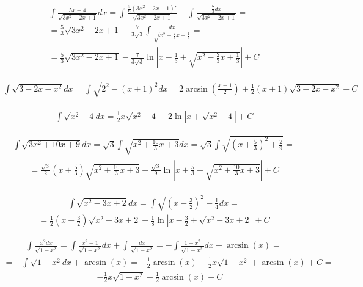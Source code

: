 \begin{gather*}
  \int \frac{5x-4}{\sqrt{3x^2-2x+1}}dx
  = \int \frac{\frac{5}{6}(3x^2-2x+1)'}{\sqrt{3x^2-2x+1}}-\int \frac{\frac{7}{3}dx}{\sqrt{3x^2-2x+1}} = \\
  = \frac{5}{3}\sqrt{3x^2-2x+1}-\frac{7}{3\sqrt{3}}\int \frac{dx}{\sqrt{x^2-\frac{2}{3}x+\frac{1}{3}}} = \\
  = \frac{5}{3}\sqrt{3x^2-2x+1}-\frac{7}{3\sqrt{3}}\ln\left|x-\frac{1}{3}+\sqrt{x^2-\frac{2}{3}x+\frac{1}{3}}\right|+C
\end{gather*}


\begin{gather*}\int \sqrt{3-2x-x^2}dx = \int \sqrt{2^2-(x+1)^2}dx = 2\arcsin \left(\frac{x+1}{2}\right) + \frac{1}{2}(x+1)\sqrt{3-2x-x^2}+C \end{gather*}



\begin{gather*}\int \sqrt{x^2-4}dx = \frac{1}{2}x\sqrt{x^2-4}-2\ln|x+\sqrt{x^2-4}|+C\end{gather*}


\begin{gather*}\int \sqrt{3x^2+10x+9}dx = \sqrt{3}\int \sqrt{x^2+\tfrac{10}{3}x+3}dx = \sqrt{3} \int \sqrt{(x+\tfrac{5}{3})^2+\tfrac{2}{9}} = \end{gather*}
\begin{gather*}= \frac{\sqrt{3}}{2}(x+\frac{5}{3})\sqrt{x^2+\tfrac{10}{3}x+3}+\frac{\sqrt{3}}{9}\ln|x+\frac{5}{3}+\sqrt{x^2+\tfrac{10}{3}x+3}|+C\end{gather*}


\begin{gather*}\int \sqrt{x^2-3x+2}dx = \int \sqrt{(x-\tfrac{3}{2})^2-\frac{1}{4}}dx = \end{gather*}
\begin{gather*}= \frac{1}{2}(x-\frac{3}{2})\sqrt{x^2-3x+2}-\frac{1}{8}\ln|x-\frac{3}{2}+\sqrt{x^2-3x+2}|+C\end{gather*}


\begin{gather*}\int \frac{x^2dx}{\sqrt{1-x^2}} = \int \frac{x^2-1}{\sqrt{1-x^2}}dx+\int \frac{dx}{\sqrt{1-x^2}} = -\int \frac{1-x^2}{\sqrt{1-x^2}}dx + \arcsin (x) = \end{gather*}
 \begin{gather*}= -\int \sqrt{1-x^2}dx+\arcsin (x) = -\frac{1}{2}\arcsin (x) - \frac{1}{2}x\sqrt{1-x^2} + \arcsin (x) + C = \end{gather*}
\begin{gather*}= -\frac{1}{2}x\sqrt{1-x^2}+\frac{1}{2}\arcsin (x)+C\end{gather*}


